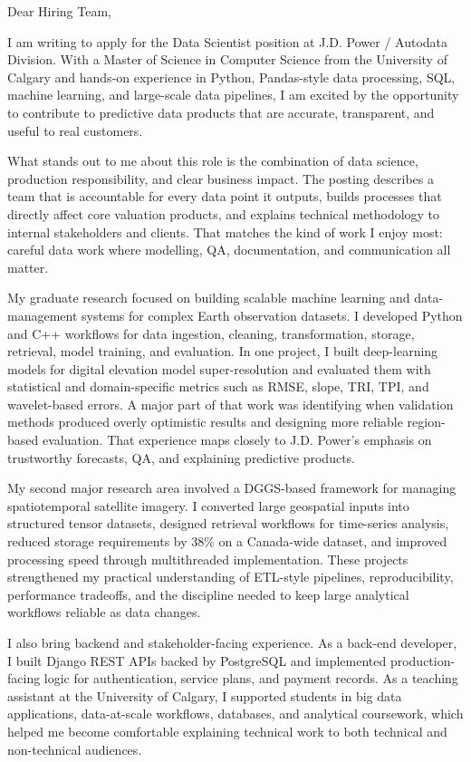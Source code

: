 \documentclass[11pt]{letter}
\begin{document}
\begin{letter}{}

\opening{Dear Hiring Team,}

I am writing to apply for the Data Scientist position at J.D. Power / Autodata Division. With a Master of Science in Computer Science from the University of Calgary and hands-on experience in Python, Pandas-style data processing, SQL, machine learning, and large-scale data pipelines, I am excited by the opportunity to contribute to predictive data products that are accurate, transparent, and useful to real customers.

What stands out to me about this role is the combination of data science, production responsibility, and clear business impact. The posting describes a team that is accountable for every data point it outputs, builds processes that directly affect core valuation products, and explains technical methodology to internal stakeholders and clients. That matches the kind of work I enjoy most: careful data work where modelling, QA, documentation, and communication all matter.

My graduate research focused on building scalable machine learning and data-management systems for complex Earth observation datasets. I developed Python and C++ workflows for data ingestion, cleaning, transformation, storage, retrieval, model training, and evaluation. In one project, I built deep-learning models for digital elevation model super-resolution and evaluated them with statistical and domain-specific metrics such as RMSE, slope, TRI, TPI, and wavelet-based errors. A major part of that work was identifying when validation methods produced overly optimistic results and designing more reliable region-based evaluation. That experience maps closely to J.D. Power's emphasis on trustworthy forecasts, QA, and explaining predictive products.

My second major research area involved a DGGS-based framework for managing spatiotemporal satellite imagery. I converted large geospatial inputs into structured tensor datasets, designed retrieval workflows for time-series analysis, reduced storage requirements by 38\% on a Canada-wide dataset, and improved processing speed through multithreaded implementation. These projects strengthened my practical understanding of ETL-style pipelines, reproducibility, performance tradeoffs, and the discipline needed to keep large analytical workflows reliable as data changes.

I also bring backend and stakeholder-facing experience. As a back-end developer, I built Django REST APIs backed by PostgreSQL and implemented production-facing logic for authentication, service plans, and payment records. As a teaching assistant at the University of Calgary, I supported students in big data applications, data-at-scale workflows, databases, and analytical coursework, which helped me become comfortable explaining technical work to both technical and non-technical audiences.


\end{letter}
\end{document}
